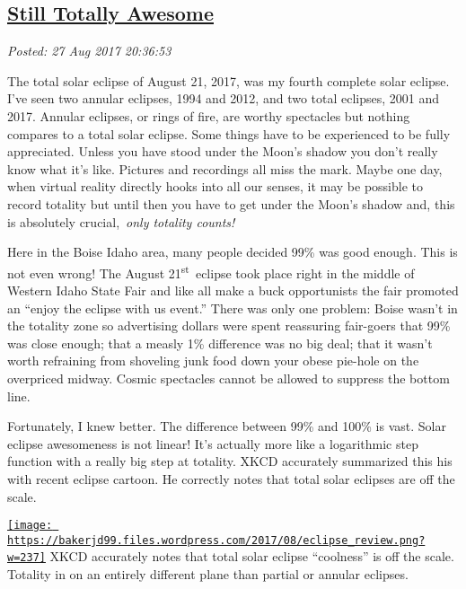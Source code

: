 %

\subsection*{\href{http://analyzethedatanotthedrivel.org/2017/08/27/still-totally-awesome/}{Still Totally Awesome}}


\noindent\emph{Posted: 27 Aug 2017 20:36:53}
\vspace{6pt}

The total solar eclipse of August 21, 2017, was my fourth complete solar
eclipse. I've seen two annular eclipses, 1994 and 2012, and two total
eclipses, 2001 and 2017. Annular eclipses, or rings of fire, are worthy
spectacles but nothing compares to a total solar eclipse. Some things
have to be experienced to be fully appreciated. Unless you have stood
under the Moon's shadow you don't really know what it's like. Pictures
and recordings all miss the mark. Maybe one day, when virtual reality
directly hooks into all our senses, it may be possible to record
totality but until then you have to get under the Moon's shadow and,
this is absolutely crucial,~\emph{only totality counts!}

Here in the Boise Idaho area, many people decided 99\% was good enough.
This is not even wrong! The August 21\textsuperscript{st}~eclipse took
place right in the middle of Western Idaho State Fair and like all make
a buck opportunists the fair promoted an ``enjoy the eclipse with us
event.'' There was only one problem: Boise wasn't in the totality zone
so advertising dollars were spent reassuring fair-goers that 99\% was
close enough; that a measly 1\% difference was no big deal; that it
wasn't worth refraining from shoveling junk food down your obese
pie-hole on the overpriced midway. Cosmic spectacles cannot be allowed
to suppress the bottom line.

Fortunately, I knew better. The difference between 99\% and 100\% is
vast. Solar eclipse awesomeness is not linear! It's actually more like a
logarithmic step function with a really big step at totality. XKCD
accurately summarized this his with recent eclipse cartoon. He correctly
notes that total solar eclipses are off the scale.


\href{https://xkcd.com/1880/}{\texttt{[image: https://bakerjd99.files.wordpress.com/2017/08/eclipse\_review.png?w=237]}}
XKCD accurately notes that total solar eclipse ``coolness'' is off the
scale. Totality in on an entirely different plane than partial or
annular eclipses.


